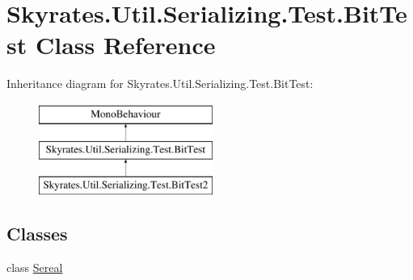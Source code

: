 \hypertarget{class_skyrates_1_1_util_1_1_serializing_1_1_test_1_1_bit_test}{\section{Skyrates.\-Util.\-Serializing.\-Test.\-Bit\-Test Class Reference}
\label{class_skyrates_1_1_util_1_1_serializing_1_1_test_1_1_bit_test}
}
Inheritance diagram for Skyrates.\-Util.\-Serializing.\-Test.\-Bit\-Test\-:\begin{figure}[H]
\begin{center}
\leavevmode
\includegraphics[height=3.000000cm]{class_skyrates_1_1_util_1_1_serializing_1_1_test_1_1_bit_test}
\end{center}
\end{figure}
\subsection*{Classes}
\begin{DoxyCompactItemize}
\item 
class \hyperlink{class_skyrates_1_1_util_1_1_serializing_1_1_test_1_1_bit_test_1_1_sereal}{Sereal}
\end{DoxyCompactItemize}
